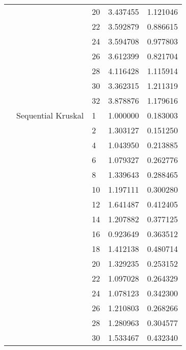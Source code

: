 \begin{tabular}{lllrr}
                      &                     & 20 &  3.437455 &  1.121046 \\
                      &                     & 22 &  3.592879 &  0.886615 \\
                      &                     & 24 &  3.594708 &  0.977803 \\
                      &                     & 26 &  3.612399 &  0.821704 \\
                      &                     & 28 &  4.116428 &  1.115914 \\
                      &                     & 30 &  3.362315 &  1.211319 \\
                      &                     & 32 &  3.878876 &  1.179616 \\
                      & Sequential Kruskal & 1  &  1.000000 &  0.183003 \\
                      &                     & 2  &  1.303127 &  0.151250 \\
                      &                     & 4  &  1.043950 &  0.213885 \\
                      &                     & 6  &  1.079327 &  0.262776 \\
                      &                     & 8  &  1.339643 &  0.288465 \\
                      &                     & 10 &  1.197111 &  0.300280 \\
                      &                     & 12 &  1.641487 &  0.412405 \\
                      &                     & 14 &  1.207882 &  0.377125 \\
                      &                     & 16 &  0.923649 &  0.363512 \\
                      &                     & 18 &  1.412138 &  0.480714 \\
                      &                     & 20 &  1.329235 &  0.253152 \\
                      &                     & 22 &  1.097028 &  0.264329 \\
                      &                     & 24 &  1.078123 &  0.342300 \\
                      &                     & 26 &  1.210803 &  0.268266 \\
                      &                     & 28 &  1.280963 &  0.304577 \\
                      &                     & 30 &  1.533467 &  0.432340 \\

\end{tabular}

